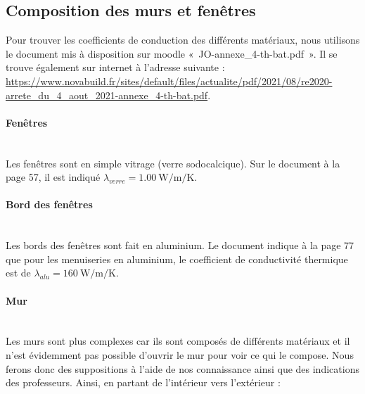 \documentclass[12pt, a4paper]{article}
\newcommand{\lambdaAlu}{\ensuremath{\lambda_{alu}}}
\newcommand{\lambdaVerre}{\ensuremath{\lambda_{verre}}}
\begin{document}
\subsection{Composition des murs et fenêtres}

Pour trouver les coefficients de conduction des différents matériaux, nous utilisons le document mis à disposition sur moodle «~JO-annexe\_4-th-bat.pdf~». Il se trouve également sur internet à l'adresse suivante : \url{https://www.novabuild.fr/sites/default/files/actualite/pdf/2021/08/re2020-arrete_du_4_aout_2021-annexe_4-th-bat.pdf}.

\paragraph{Fenêtres} \phantom{.} \\

Les fenêtres sont en simple vitrage (verre sodocalcique). Sur le document à la page 57, il est indiqué $\boxed{\lambdaVerre = \SI{1.00}{\watt\per\meter\per\kelvin}}$.

\paragraph{Bord des fenêtres} \phantom{.} \\

Les bords des fenêtres sont fait en aluminium. Le document indique à la page 77 que pour les menuiseries en aluminium, le coefficient de conductivité thermique est de $\boxed{\lambdaAlu = \SI{160}{\watt\per\meter\per\kelvin}}$.

\paragraph{Mur} \phantom{.} \\

Les murs sont plus complexes car ils sont composés de différents matériaux et il n'est évidemment pas possible d'ouvrir le mur pour voir ce qui le compose. Nous ferons donc des suppositions à l'aide de nos connaissance ainsi que des indications des professeurs. Ainsi, en partant de l'intérieur vers l'extérieur :
\end{document}

